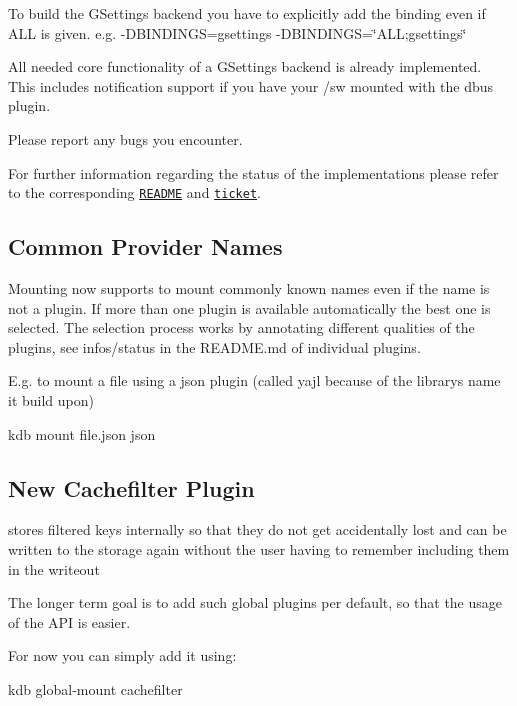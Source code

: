 To build the G\+Settings backend you have to explicitly add the binding even if {\ttfamily A\+LL} is given. e.\+g. {\ttfamily -\/\+D\+B\+I\+N\+D\+I\+N\+GS=gsettings} {\ttfamily -\/\+D\+B\+I\+N\+D\+I\+N\+GS=\char`\"{}\+A\+L\+L;gsettings\char`\"{}}

All needed core functionality of a G\+Settings backend is already implemented. This includes notification support if you have your {\ttfamily /sw} mounted with the dbus plugin.

Please report any bugs you encounter.

For further information regarding the status of the implementations please refer to the corresponding \href{https://github.com/elektrainitiative/libelektra/tree/master/src/bindings/gsettings}{\tt R\+E\+A\+D\+ME} and \href{https://github.com/ElektraInitiative/libelektra/issues/775}{\tt ticket}.

\subsection*{Common Provider Names}

Mounting now supports to mount commonly known names even if the name is not a plugin. If more than one plugin is available automatically the best one is selected. The selection process works by annotating different qualities of the plugins, see {\ttfamily infos/status} in the R\+E\+A\+D\+M\+E.\+md of individual plugins.

E.\+g. to mount a file using a json plugin (called yajl because of the library\textquotesingle{}s name it build upon)


\begin{DoxyCode}
kdb mount file.json json
\end{DoxyCode}


\subsection*{New Cachefilter Plugin}

stores filtered keys internally so that they do not get accidentally lost and can be written to the storage again without the user having to remember including them in the writeout

The longer term goal is to add such global plugins per default, so that the usage of the A\+PI is easier.

For now you can simply add it using\+:


\begin{DoxyCode}
kdb global-mount cachefilter
\end{DoxyCode}


